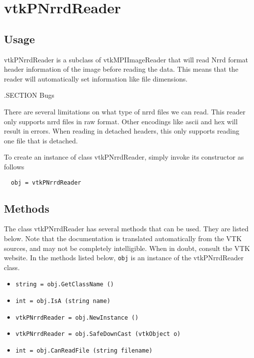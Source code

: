 \section{vtkPNrrdReader}

\subsection{Usage}


 vtkPNrrdReader is a subclass of vtkMPIImageReader that will read Nrrd format
 header information of the image before reading the data.  This means that the
 reader will automatically set information like file dimensions.

 .SECTION Bugs

 There are several limitations on what type of nrrd files we can read.  This
 reader only supports nrrd files in raw format.  Other encodings like ascii
 and hex will result in errors.  When reading in detached headers, this only
 supports reading one file that is detached.


To create an instance of class vtkPNrrdReader, simply
invoke its constructor as follows
\begin{verbatim}
  obj = vtkPNrrdReader
\end{verbatim}
\subsection{Methods}

The class vtkPNrrdReader has several methods that can be used.
  They are listed below.
Note that the documentation is translated automatically from the VTK sources,
and may not be completely intelligible.  When in doubt, consult the VTK website.
In the methods listed below, \verb|obj| is an instance of the vtkPNrrdReader class.
\begin{itemize}
\item  \verb|string = obj.GetClassName ()|

\item  \verb|int = obj.IsA (string name)|

\item  \verb|vtkPNrrdReader = obj.NewInstance ()|

\item  \verb|vtkPNrrdReader = obj.SafeDownCast (vtkObject o)|

\item  \verb|int = obj.CanReadFile (string filename)|

\end{itemize}
